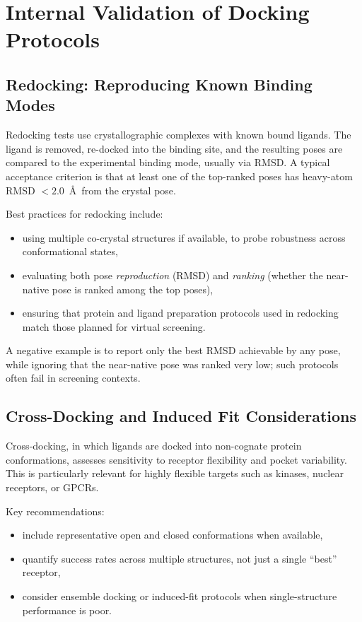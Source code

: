 \documentclass[12pt,a4paper]{article}
\begin{document}
\section{Internal Validation of Docking Protocols}

\subsection{Redocking: Reproducing Known Binding Modes}

Redocking tests use crystallographic complexes with known bound ligands. The ligand is removed, re-docked into the binding site, and the resulting poses are compared to the experimental binding mode, usually via RMSD. A typical acceptance criterion is that at least one of the top-ranked poses has heavy-atom RMSD $< 2.0$~\AA\ from the crystal pose.\cite{CH8_Warren2006,CH8_Kitchen2004,CH8_Cheng2009}

Best practices for redocking include:

\begin{itemize}
  \item using multiple co-crystal structures if available, to probe robustness across conformational states,
  \item evaluating both pose \emph{reproduction} (RMSD) and \emph{ranking} (whether the near-native pose is ranked among the top poses),
  \item ensuring that protein and ligand preparation protocols used in redocking match those planned for virtual screening.
\end{itemize}

A negative example is to report only the best RMSD achievable by any pose, while ignoring that the near-native pose was ranked very low; such protocols often fail in screening contexts.

\subsection{Cross-Docking and Induced Fit Considerations}

Cross-docking, in which ligands are docked into non-cognate protein conformations, assesses sensitivity to receptor flexibility and pocket variability. This is particularly relevant for highly flexible targets such as kinases, nuclear receptors, or GPCRs.\cite{CH8_Huang2011,CH8_PandFutureDocking2020}

Key recommendations:

\begin{itemize}
  \item include representative open and closed conformations when available,
  \item quantify success rates across multiple structures, not just a single ``best'' receptor,
  \item consider ensemble docking or induced-fit protocols when single-structure performance is poor.
\end{itemize}
\end{document}
